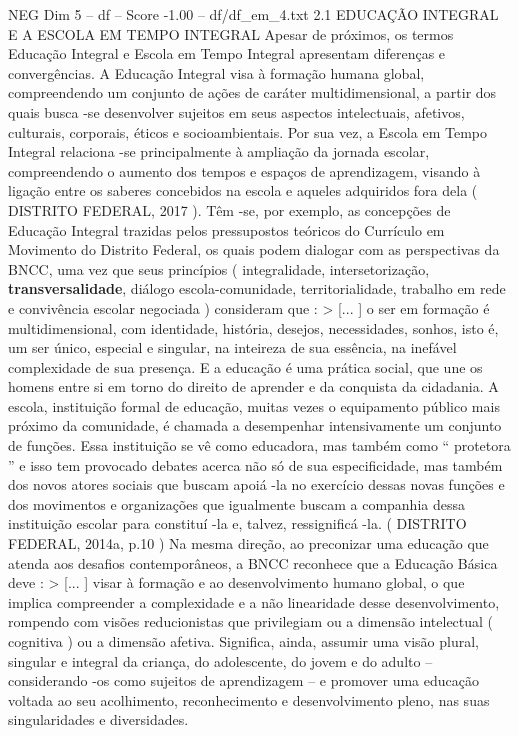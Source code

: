 \begin{textsample}{NEG Dim 5 – df – Score -1.00 – df/df\_em\_4.txt}  \label{ex:f5_neg_140}
2.1 EDUCAÇÃO INTEGRAL E A ESCOLA EM TEMPO INTEGRAL Apesar de próximos, os termos Educação Integral e Escola em Tempo Integral apresentam diferenças e convergências.
A Educação Integral visa à formação humana global, compreendendo um conjunto de ações de caráter multidimensional, a partir dos quais busca -se desenvolver sujeitos em seus aspectos intelectuais, afetivos, culturais, corporais, éticos e socioambientais.
Por sua vez, a Escola em Tempo Integral relaciona -se principalmente à ampliação da jornada escolar, compreendendo o aumento dos tempos e espaços de aprendizagem, visando à ligação entre os saberes concebidos na escola e aqueles adquiridos fora dela ( DISTRITO FEDERAL, 2017 ).
Têm -se, por exemplo, as concepções de Educação Integral trazidas pelos pressupostos teóricos do Currículo em Movimento do Distrito Federal, os quais podem dialogar com as perspectivas da BNCC, uma vez que seus princípios ( integralidade, intersetorização, \textbf{transversalidade}, diálogo escola-comunidade, territorialidade, trabalho em rede e convivência escolar negociada ) consideram que : > [... ] o ser em formação é multidimensional, com identidade, história, desejos, necessidades, sonhos, isto é, um ser único, especial e singular, na inteireza de sua essência, na inefável complexidade de sua presença.
E a educação é uma prática social, que une os homens entre si em torno do direito de aprender e da conquista da cidadania.
A escola, instituição formal de educação, muitas vezes o equipamento público mais próximo da comunidade, é chamada a desempenhar intensivamente um conjunto de funções.
Essa instituição se vê como educadora, mas também como “ protetora ” e isso tem provocado debates acerca não só de sua especificidade, mas também dos novos atores sociais que buscam apoiá -la no exercício dessas novas funções e dos movimentos e organizações que igualmente buscam a companhia dessa instituição escolar para constituí -la e, talvez, ressignificá -la. ( DISTRITO FEDERAL, 2014a, p.10 ) Na mesma direção, ao preconizar uma educação que atenda aos desafios contemporâneos, a BNCC reconhece que a Educação Básica deve : > [... ] visar à formação e ao desenvolvimento humano global, o que implica compreender a complexidade e a não linearidade desse desenvolvimento, rompendo com visões reducionistas que privilegiam ou a dimensão intelectual ( cognitiva ) ou a dimensão afetiva.
Significa, ainda, assumir uma visão plural, singular e integral da criança, do adolescente, do jovem e do adulto – considerando -os como sujeitos de aprendizagem – e promover uma educação voltada ao seu acolhimento, reconhecimento e desenvolvimento pleno, nas suas singularidades e diversidades.

\end{textsample}

